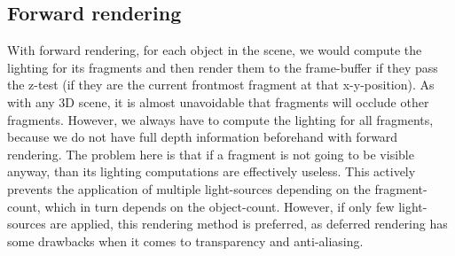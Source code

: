\documentclass{ACGSeminar}
\begin{document}
	\subsection{Forward rendering}
		With forward rendering, for each object in the scene, we would compute the lighting for its fragments and then render them to the frame-buffer if they pass the z-test (if they are the current frontmost fragment at that x-y-position). As with any 3D scene, it is almost unavoidable that fragments will occlude other fragments. However, we always have to compute the lighting for all fragments, because we do not have full depth information beforehand with forward rendering. The problem here is that if a fragment is not going to be visible anyway, than its lighting computations are effectively useless. This actively prevents the application of multiple light-sources depending on the fragment-count, which in turn depends on the object-count. However, if only few light-sources are applied, this rendering method is preferred, as deferred rendering has some drawbacks when it comes to transparency and anti-aliasing.
\end{document}

